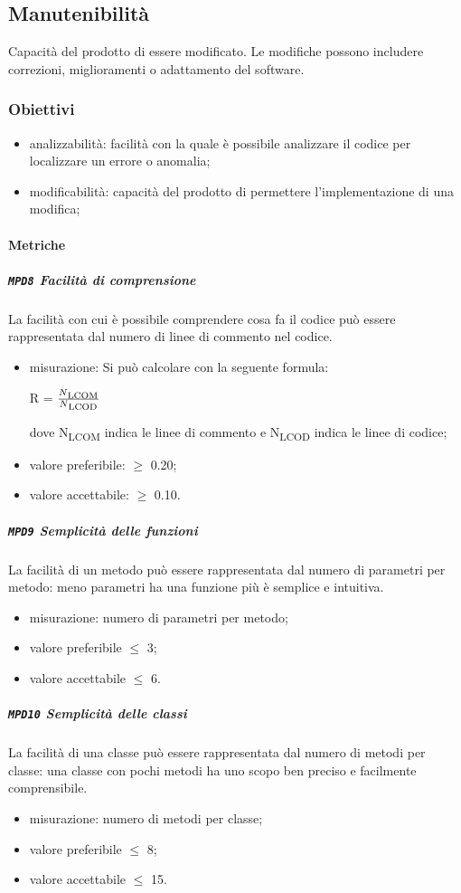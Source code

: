	\subsection{Manutenibilità}
	Capacità del prodotto di essere modificato. Le modifiche possono includere correzioni, miglioramenti o adattamento del software.
		\subsubsection{Obiettivi}
		\begin{itemize}
			\item analizzabilità: facilità con la quale è possibile analizzare il codice per localizzare un errore o anomalia;
			\item modificabilità: capacità del prodotto di permettere l'implementazione di una modifica;
		\end{itemize}
		\paragraph{Metriche}
			\subparagraph{\texttt{MPD8} Facilità di comprensione}
			La facilità con cui è possibile comprendere cosa fa il codice può essere rappresentata dal numero di linee di commento nel codice.
			\begin{itemize}
			\item misurazione: Si può calcolare con la seguente formula: \\
			\centerline{R = \(\frac{N\textsubscript{LCOM}}{N\textsubscript{LCOD}} \) }
			dove N\textsubscript{LCOM} indica le linee di commento e N\textsubscript{LCOD} indica le linee di codice;
			\item valore preferibile: $\geq$ 0.20;
			\item valore accettabile: $\geq$ 0.10.
			\end{itemize}
			\subparagraph{\texttt{MPD9} Semplicità delle funzioni}
			La facilità di un metodo può essere rappresentata dal numero di parametri per metodo: meno parametri ha una funzione più è semplice e intuitiva.
			\begin{itemize}
			\item misurazione: numero di parametri per metodo;
			\item valore preferibile $\leq$ 3;
			\item valore accettabile $\leq$ 6.
			\end{itemize}
			\subparagraph{\texttt{MPD10} Semplicità delle classi}
			La facilità di una classe può essere rappresentata dal numero di metodi per classe: una classe con pochi metodi ha uno scopo ben preciso e facilmente comprensibile.
			\begin{itemize}
			\item misurazione: numero di metodi per classe;
			\item valore preferibile $\leq$ 8;
			\item valore accettabile $\leq$ 15.
			\end{itemize}			
			
